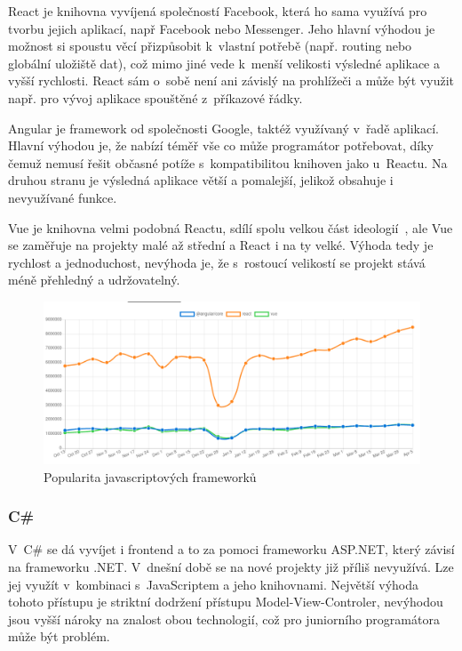 React je knihovna vyvíjená společností Facebook, která ho sama využívá pro tvorbu jejich aplikací, např Facebook nebo Messenger. Jeho hlavní výhodou je možnost si spoustu věcí přizpůsobit k~vlastní potřebě (např. routing nebo globální uložiště dat), což mimo jiné vede k~menší velikosti výsledné aplikace a vyšší rychlosti. React sám o~sobě není ani závislý na prohlížeči a může být využit např. pro vývoj aplikace spouštěné z~příkazové řádky.

Angular je framework od společnosti Google, taktéž využívaný v~řadě aplikací. Hlavní výhodou je, že nabízí téměř vše co může programátor potřebovat, díky čemuž nemusí řešit občasné potíže s~kompatibilitou knihoven jako u~Reactu. Na druhou stranu je výsledná aplikace větší a pomalejší, jelikož obsahuje i nevyužívané funkce.

Vue je knihovna velmi podobná Reactu, sdílí spolu velkou část ideologií~\cite{you_2014_comparison}, ale Vue se zaměřuje na projekty malé až střední a React i na ty velké. Výhoda tedy je rychlost a jednoduchost, nevýhoda je, že s~rostoucí velikostí se projekt stává méně přehledný a udržovatelný.

\begin{figure}
    \centering
    \includegraphics[width=\textwidth]{assets/popularity_plot.png}
    \caption[Popularita javascriptových frameworků]{Popularita javascriptových frameworků~\cite{potter_2020_npm}}
    \label{fig:popularity_plot}
\end{figure}

\subsubsection*{C\# }
V~C\# se dá vyvíjet i frontend a to za pomoci frameworku ASP.NET, který závisí na frameworku .NET. V~dnešní době se na nové projekty již příliš nevyužívá. Lze jej využít v~kombinaci s~JavaScriptem a jeho knihovnami. Největší výhoda tohoto přístupu je striktní dodržení přístupu Model-View-Controler, nevýhodou jsou vyšší nároky na znalost obou technologií, což pro juniorního programátora může být problém.

